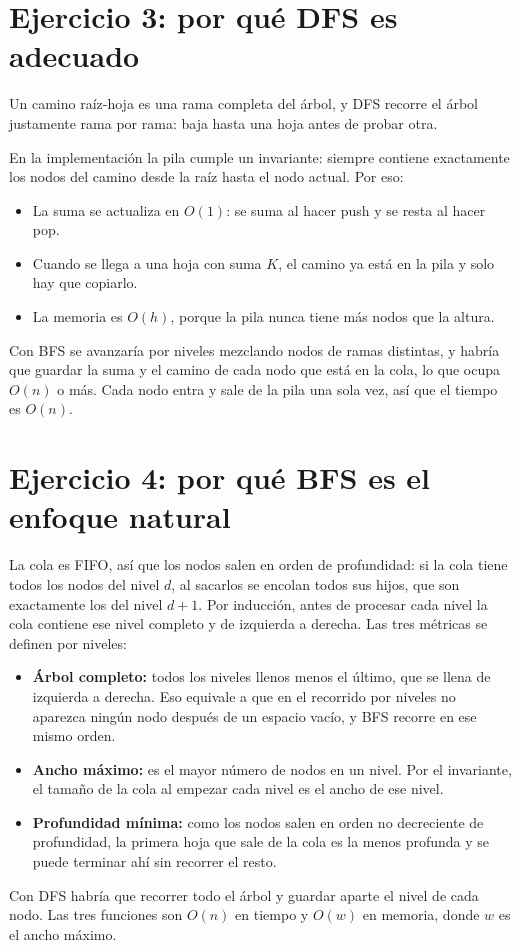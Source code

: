 \documentclass[11pt]{article}
\begin{document}
\section{Ejercicio 3: por qué DFS es adecuado}

Un camino raíz-hoja es una rama completa del árbol, y DFS recorre el árbol justamente rama por rama: baja hasta una hoja antes de probar otra.

En la implementación la pila cumple un invariante: siempre contiene exactamente los nodos del camino desde la raíz hasta el nodo actual. Por eso:

\begin{itemize}
\item La suma se actualiza en $O(1)$: se suma al hacer push y se resta al hacer pop.
\item Cuando se llega a una hoja con suma $K$, el camino ya está en la pila y solo hay que copiarlo.
\item La memoria es $O(h)$, porque la pila nunca tiene más nodos que la altura.
\end{itemize}

Con BFS se avanzaría por niveles mezclando nodos de ramas distintas, y habría que guardar la suma y el camino de cada nodo que está en la cola, lo que ocupa $O(n)$ o más. Cada nodo entra y sale de la pila una sola vez, así que el tiempo es $O(n)$.

\section{Ejercicio 4: por qué BFS es el enfoque natural}

La cola es FIFO, así que los nodos salen en orden de profundidad: si la cola tiene todos los nodos del nivel $d$, al sacarlos se encolan todos sus hijos, que son exactamente los del nivel $d + 1$. Por inducción, antes de procesar cada nivel la cola contiene ese nivel completo y de izquierda a derecha. Las tres métricas se definen por niveles:

\begin{itemize}
\item \textbf{Árbol completo:} todos los niveles llenos menos el último, que se llena de izquierda a derecha. Eso equivale a que en el recorrido por niveles no aparezca ningún nodo después de un espacio vacío, y BFS recorre en ese mismo orden.
\item \textbf{Ancho máximo:} es el mayor número de nodos en un nivel. Por el invariante, el tamaño de la cola al empezar cada nivel es el ancho de ese nivel.
\item \textbf{Profundidad mínima:} como los nodos salen en orden no decreciente de profundidad, la primera hoja que sale de la cola es la menos profunda y se puede terminar ahí sin recorrer el resto.
\end{itemize}

Con DFS habría que recorrer todo el árbol y guardar aparte el nivel de cada nodo. Las tres funciones son $O(n)$ en tiempo y $O(w)$ en memoria, donde $w$ es el ancho máximo.
\end{document}
